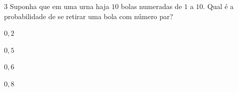 

\num{3}  Suponha que em uma urna haja $10$ bolas numeradas de $1$ a $10$. Qual é a
probabilidade de se retirar uma bola com número par?

\begin{escolha}
\item $0,2$
\item $0,5$
\item $0,6$
\item $0,8$
\end{escolha}




